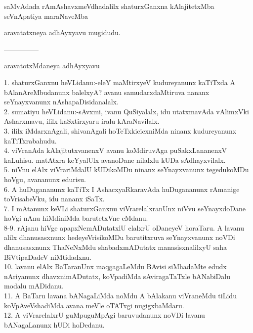 \documentclass{article}
\begin{document}
\begin{center}
saMvAdada rAmAshavxmeVdhadalilx shaturxGanxna kAlajitetxMba seVnApatiya maraNaveMba
\end{center}

\begin{center}
aravatatxneya adhAyxyavu mugidudu.
\end{center}

\begin{center}
---------------
\end{center}

\begin{center}
aravatotxMdaneya adhAyxyavu
\end{center}

1. shaturxGanxnu heVLidanu:-eleY maMtirxyeV kudureyanunx kaTiTxda A bAlanAreMbudanunx balelxyA? avanu samudarxdaMtiruva nananx seYnayxvanunx nAshapaDisidanalalx.\\
2. sumatiyu heVLidanu:-sAvxmi, ivanu QuSiyalalx, idu utatxmavAda vAlimxVki Asharxmavu, ililx kaSxtirxyaru iralu kAraNavilalx.\\
3. ililx iMdarxnAgali, shivanAgali hoTeTxkicicxniMda ninanx kudureyanunx kaTiTxrabahudu.\\
4. viVranAda kAlajitutxvanenxV avanu koMdiruvAga puSakxLananenxV kaLuhisu. matAtxra keYyalUlx avanoDane nilalxlu kUDa sAdhayxvilalx.\\
5. niVnu elAlx viVrariMdalU kUDikoMDu ninanx seYnayxvanunx tegedukoMDu hoVgu, avananunx edurisu.\\
6. A huDugananunx kaTiTx I AshacxyaRkaravAda huDugananunx rAmanige toVrisabeVku, idu nananx iSaTx.\\
7. I mAtanunx keVLi shaturxGanxnu viVrarelalxranUnx niVvu seYnayxdoDane hoVgi nAnu hiMdiniMda barutetxVne eMdanu.\\
8-9. rAjanu hiVge apapxNemADutatxlU elalxrU oDaneyeV horaTaru. A lavanu alilx dhanusasxnunx hedeyeVrisikoMDu barutitxruva seYnayxvanunx noVDi dhanusasxnunx ThaNeNxMdu shabadxmADutatx manasisxnalilxyU saha BiVtipaDadeV niMtidadxnu.\\
10. lavanu elAlx BaTaranUnx maqgagaLeMdu BAvisi siMhadaMte edudx nAriyanunx dhavxnimADutatx, koVpadiMda sAviragaTaTxle bANabiDalu modalu mADidanu.\\
11. A BaTaru lavana bANagaLiMda noMdu A bAlakanu viVraneMdu tiLidu koVpAveVshadiMda avana meVle oTATxgi nugigxbaMdaru.\\
12. A viVrarelalxrU guMpuguMpAgi baruvudanunx noVDi lavanu bANagaLanunx hUDi hoDedanu.\\
\end{document}
